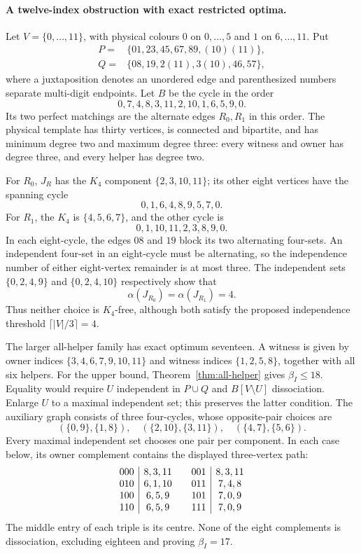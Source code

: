 \paragraph{A twelve-index obstruction with exact restricted optima.}
Let $V=\{0,\ldots,11\}$, with physical colours $0$ on $0,\ldots,5$ and $1$
on $6,\ldots,11$. Put
\begin{align*}
 P={}&\{01,23,45,67,89,(10)(11)\},\\
 Q={}&\{08,19,2(11),3(10),46,57\},
\end{align*}
where a juxtaposition denotes an unordered edge and parenthesized numbers
separate multi-digit endpoints. Let $B$ be the cycle in the order
\[
 0,7,4,8,3,11,2,10,1,6,5,9,0.
\]
Its two perfect matchings are the alternate edges $R_0,R_1$ in this order.
The physical template has thirty vertices, is connected and bipartite, and
has minimum degree two and maximum degree three: every witness and owner
has degree three, and every helper has degree two.

For $R_0$, $J_R$ has the $K_4$ component $\{2,3,10,11\}$; its other eight
vertices have the spanning cycle
\[
 0,1,6,4,8,9,5,7,0.
\]
For $R_1$, the $K_4$ is $\{4,5,6,7\}$, and the other cycle is
\[
 0,1,10,11,2,3,8,9,0.
\]
In each eight-cycle, the edges $08$ and $19$ block its two alternating
four-sets. An independent four-set in an eight-cycle must be alternating,
so the independence number of either eight-vertex remainder is at most
three. The independent sets $\{0,2,4,9\}$ and $\{0,2,4,10\}$ respectively
show that
\[
 \alpha(J_{R_0})=\alpha(J_{R_1})=4.
\]
Thus neither choice is $K_4$-free, although both satisfy the proposed
independence threshold $\lceil|V|/3\rceil=4$.

The larger all-helper family has exact optimum seventeen. A witness is given
by owner indices $\{3,4,6,7,9,10,11\}$ and witness indices $\{1,2,5,8\}$,
together with all six helpers. For the upper bound, Theorem~\ref{thm:all-helper}
gives $\beta_I\le18$. Equality would require $U$ independent in $P\cup Q$
and $B[V\setminus U]$ dissociation. Enlarge $U$ to a maximal independent
set; this preserves the latter condition. The auxiliary graph consists of
three four-cycles, whose opposite-pair choices are
\[
 (\{0,9\},\{1,8\}),\quad
 (\{2,10\},\{3,11\}),\quad
 (\{4,7\},\{5,6\}).
\]
Every maximal independent set chooses one pair per component. In each case
below, its owner complement contains the displayed three-vertex path:
\[
\begin{array}{c|c@{\qquad}c|c}
000&8,3,11&001&8,3,11\\
010&6,1,10&011&7,4,8\\
100&6,5,9&101&7,0,9\\
110&6,5,9&111&7,0,9
\end{array}
\]
The middle entry of each triple is its centre. None of the eight complements
is dissociation, excluding eighteen and proving $\beta_I=17$.

